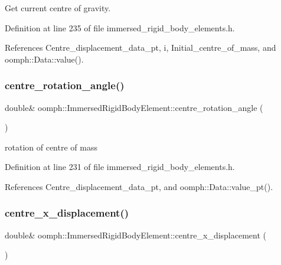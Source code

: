 Get current centre of gravity. 



Definition at line 235 of file immersed\+\_\+rigid\+\_\+body\+\_\+elements.\+h.



References Centre\+\_\+displacement\+\_\+data\+\_\+pt, i, Initial\+\_\+centre\+\_\+of\+\_\+mass, and oomph\+::\+Data\+::value().

\mbox{\label{classoomph_1_1ImmersedRigidBodyElement_aca1ade4ee20982d2f91c10d3730c0f00}} 
\subsubsection{\texorpdfstring{centre\+\_\+rotation\+\_\+angle()}{centre\_rotation\_angle()}}
{\footnotesize\ttfamily double\& oomph\+::\+Immersed\+Rigid\+Body\+Element\+::centre\+\_\+rotation\+\_\+angle (\begin{DoxyParamCaption}{ }\end{DoxyParamCaption})\hspace{0.3cm}{\ttfamily [inline]}}



rotation of centre of mass 



Definition at line 231 of file immersed\+\_\+rigid\+\_\+body\+\_\+elements.\+h.



References Centre\+\_\+displacement\+\_\+data\+\_\+pt, and oomph\+::\+Data\+::value\+\_\+pt().

\mbox{\label{classoomph_1_1ImmersedRigidBodyElement_ad8dd9dad803362a51742fc9e79aa6aa7}} 
\subsubsection{\texorpdfstring{centre\+\_\+x\+\_\+displacement()}{centre\_x\_displacement()}}
{\footnotesize\ttfamily double\& oomph\+::\+Immersed\+Rigid\+Body\+Element\+::centre\+\_\+x\+\_\+displacement (\begin{DoxyParamCaption}{ }\end{DoxyParamCaption})\hspace{0.3cm}{\ttfamily [inline]}}



